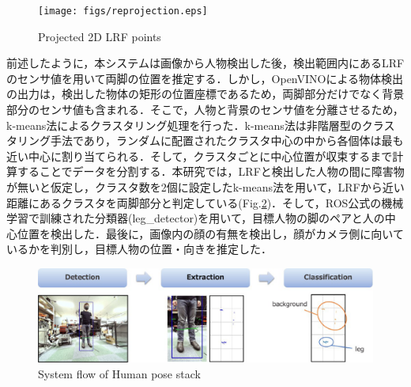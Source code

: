 \documentclass[12pt]{sonota/aislab}
\begin{document}

\begin{figure}[t]
\begin{center}
\texttt{[image: figs/reprojection.eps]}
\caption{Projected 2D LRF points}
\label{reprojection}
\end{center}
\end{figure}

前述したように，本システムは画像から人物検出した後，検出範囲内にあるLRFのセンサ値を用いて両脚の位置を推定する．しかし，OpenVINOによる物体検出の出力は，検出した物体の矩形の位置座標であるため，両脚部分だけでなく背景部分のセンサ値も含まれる．そこで，人物と背景のセンサ値を分離させるため，k-means法によるクラスタリング処理を行った．k-means法は非階層型のクラスタリング手法であり，ランダムに配置されたクラスタ中心の中から各個体は最も近い中心に割り当てられる．そして，クラスタごとに中心位置が収束するまで計算することでデータを分割する．本研究では，LRFと検出した人物の間に障害物が無いと仮定し，クラスタ数を2個に設定したk-means法を用いて，LRFから近い距離にあるクラスタを両脚部分と判定している(Fig.\ref{human_lidar_flow})．そして，ROS公式の機械学習で訓練された分類器(leg\_detector)を用いて，目標人物の脚のペアと人の中心位置を検出した．最後に，画像内の顔の有無を検出し，顔がカメラ側に向いているかを判別し，目標人物の位置・向きを推定した．

\begin{figure}[t]
\begin{center}
\includegraphics[clip, width=12cm]{figs/human_lidar_flow.eps}
\caption{System flow of Human pose stack}
\label{human_lidar_flow}
\end{center}
\end{figure}
\end{document}
